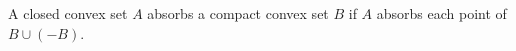 A closed convex set $A$ absorbs a compact convex set $B$ if $A$ absorbs each point of $B \cup (-B)$.
